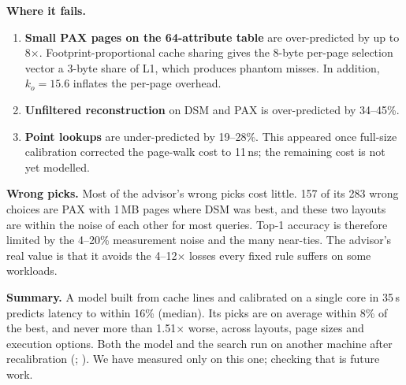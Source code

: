 \textbf{Where it fails.}
\begin{enumerate}
  \item \textbf{Small PAX pages on the 64-attribute table} are over-predicted by up to
  8$\times$. Footprint-proportional cache sharing gives the 8-byte per-page selection vector a
  3-byte share of L1, which produces phantom misses. In addition, $k_o = 15.6$ inflates the
  per-page overhead.
  \item \textbf{Unfiltered reconstruction} on DSM and PAX is over-predicted by 34--45\%.
  \item \textbf{Point lookups} are under-predicted by 19--28\%. This appeared once full-size
  calibration corrected the page-walk cost to 11\,ns; the remaining cost is not yet modelled.
\end{enumerate}

\textbf{Wrong picks.} Most of the advisor's wrong picks cost little. 157 of its 283 wrong
choices are PAX with 1\,MB pages where DSM was best, and these two layouts are within the
noise of each other for most queries. Top-1 accuracy is therefore limited by the 4--20\%
measurement noise and the many near-ties. The advisor's real value is that it avoids the
4--12$\times$ losses every fixed rule suffers on some workloads.

\textbf{Summary.} A model built from cache lines and calibrated on a single core in 35\,s
predicts latency to within 16\% (median). Its picks are on average within 8\% of the best, and
never more than 1.51$\times$ worse, across layouts, page sizes and execution options. Both the
model and the search run on another machine after recalibration (;
). We have measured only on this one; checking that is future
work.
